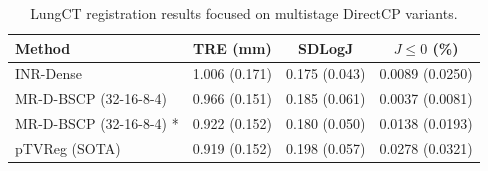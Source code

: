 \begin{table}[t]
\centering
\caption{LungCT registration results focused on multistage DirectCP variants.}
\label{tab:lungct10-publication-multistage-focus}
\begin{tabular}{lccc}
\toprule
Method & TRE (mm) & SDLogJ & $J\leq 0$ (\%) \\
\midrule
INR-Dense & 1.006 (0.171) & 0.175 (0.043) & 0.0089 (0.0250) \\
MR-D-BSCP (32-16-8-4) & 0.966 (0.151) & 0.185 (0.061) & 0.0037 (0.0081) \\
MR-D-BSCP (32-16-8-4) * & 0.922 (0.152) & 0.180 (0.050) & 0.0138 (0.0193) \\
pTVReg (SOTA) & 0.919 (0.152) & 0.198 (0.057) & 0.0278 (0.0321) \\
\bottomrule
\end{tabular}
\end{table}
